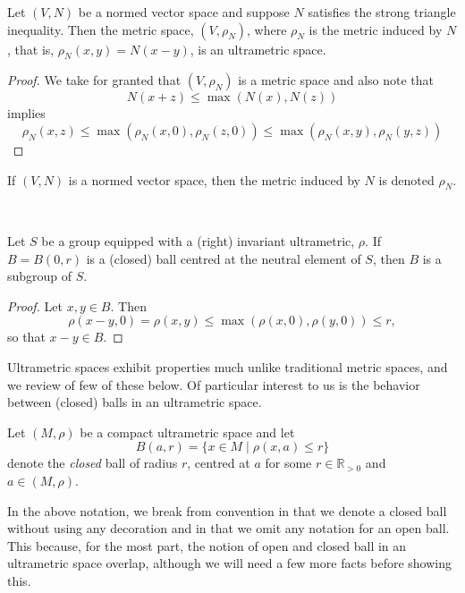 \begin{proposition}
	Let $(V,N)$ be a normed vector space and suppose $N$ satisfies the strong triangle inequality. Then the metric space, $(V,\rho_N)$, where $\rho_N$ is the metric induced by $N$, that is, $\rho_N(x,y) = N(x-y)$, is an ultrametric space.
\end{proposition}

\begin{proof}
We take for granted that  $(V,\rho_N)$ is a metric space and also note that 
\[N(x + z) \leq \max(N(x), N(z))\]
 implies  
\[\rho_N(x,z) \leq \max(\rho_N(x,0), \rho_N(z,0)) \leq \max(\rho_N(x,y), \rho_N(y,z))\]
\end{proof}

\begin{notation*}
 If $(V, N)$ is a normed vector space, then the metric induced by $N$ is denoted $\rho_N$.
\end{notation*}

\\

\begin{proposition}
\cite{ar} Let $S$ be a  group equipped with a (right) invariant ultrametric, $\rho$. If $B=B(0,r)$ is a (closed) ball centred at the neutral element of $S$, then $B$ is a subgroup of $S$.
\end{proposition}

\begin{proof}
Let $x,y \in B$. Then \[\rho(x-y,0) = \rho(x,y)  \leq \max(\rho(x,0), \rho(y,0)) \leq r,\]
so that $x-y \in B$.
\end{proof}


Ultrametric spaces exhibit properties much unlike traditional metric spaces, and we review of few of these below. Of particular interest to us is the behavior between (closed) balls in an ultrametric space.\\

\begin{notation*}
	Let $(M, \rho)$ be a compact ultrametric space and let \[B(a, r)=\{x \in M \mid \rho(x,a) \leq r\}\] denote the \textit{closed} ball of radius $r$, centred at $a$ for some $r \in \mathbb{R}_{> 0}$ and $a \in (M,\rho)$.
\end{notation*} 
In the above notation, we break from  convention in that we denote a closed ball without using any decoration and in that we omit any notation for an open ball. This because, for the most part, the notion of open and closed ball in an ultrametric space overlap, although we will need a few more facts before showing this.\\

